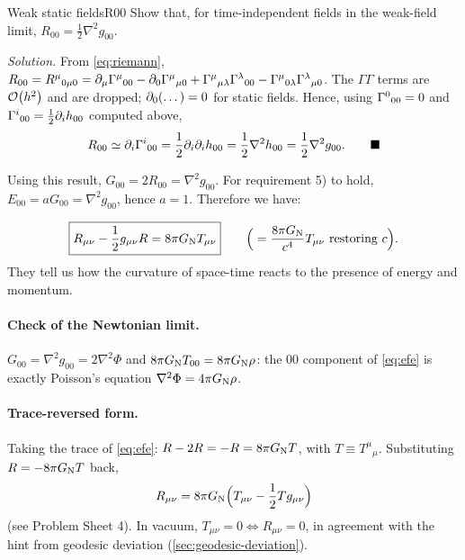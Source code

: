 \begin{exercise}{Weak static fields}{R00}
Show that, for time-independent fields in the weak-field limit, $R_{00}=\frac12\nabla^2g_{00}$.

\textit{Solution.} From \eqref{eq:riemann}, $R_{00}=R^{\mu}{}_{0\mu0}=\partial_\mu\Gamma^{\mu}{}_{00}-\partial_0\Gamma^{\mu}{}_{\mu0}+\Gamma^{\mu}{}_{\mu\lambda}\Gamma^{\lambda}{}_{00}-\Gamma^{\mu}{}_{0\lambda}\Gamma^{\lambda}{}_{\mu0}$. The $\Gamma\Gamma$ terms are $\mathcal{O}\!\left(h^2\right)$ and are dropped; $\partial_0(\dots)=0$ for static fields. Hence, using $\Gamma^{0}{}_{00}=0$ and $\Gamma^{i}{}_{00}=\frac12\partial_ih_{00}$ computed above,
\[
  R_{00}\simeq\partial_i\Gamma^{i}{}_{00}=\frac12\partial_i\partial_ih_{00}=\frac12\nabla^2h_{00}=\frac12\nabla^2g_{00}. \qquad\blacksquare
\]
\end{exercise}

Using this result, $G_{00}=2R_{00}=\nabla^2g_{00}$. For requirement 5) to hold, $E_{00}=aG_{00}=\nabla^2g_{00}$, hence $a=1$. Therefore we have:

\begin{keyresult}
\begin{equation}
  \boxed{R_{\mu\nu}-\frac12g_{\mu\nu}R=8\pi\GN T_{\mu\nu}}\qquad\Big(=\frac{8\pi\GN}{c^4}T_{\mu\nu}\ \text{restoring}\ c\Big).
  \label{eq:efe}
\end{equation}
They tell us how the curvature of space-time reacts to the presence of energy and momentum.
\end{keyresult}

\paragraph{Check of the Newtonian limit.} $G_{00}=\nabla^2g_{00}=2\nabla^2\Phi$ and $8\pi G_{\mathrm N} T_{00}=8\pi G_{\mathrm N}\rho$: the $00$ component of \eqref{eq:efe} is exactly Poisson's equation $\nabla^2\Phi=4\pi G_{\mathrm N}\rho$.

\paragraph{Trace-reversed form.} Taking the trace of \eqref{eq:efe}: $R-2R=-R=8\pi G_{\mathrm N} T$, with $T\equiv T^\mu{}_\mu$. Substituting $R=-8\pi G_{\mathrm N} T$ back,
\begin{equation}
  R_{\mu\nu}=8\pi G_{\mathrm N}\Big(T_{\mu\nu}-\frac12Tg_{\mu\nu}\Big)
\end{equation}
(see Problem Sheet 4). In vacuum, $T_{\mu\nu}=0\Leftrightarrow R_{\mu\nu}=0$, in agreement with the hint from geodesic deviation (\cref{sec:geodesic-deviation}).

